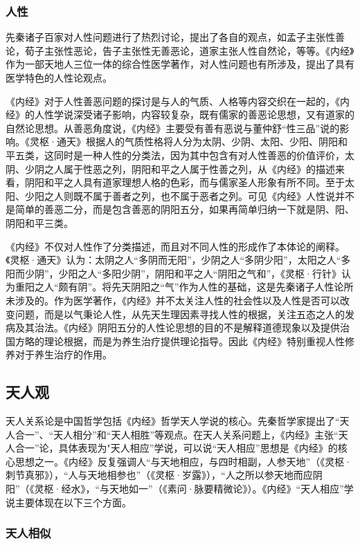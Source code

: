 \documentclass[draft,12pt]{ctexbook}
\begin{document}
\subsubsection{人性}%

先秦诸子百家对人性问题进行了热烈讨论，提出了各自的观点，如孟子主张性善论，荀子主张性恶论，告子主张性无善恶论，道家主张人性自然论，等等。《内经》作为一部天地人三位一体的综合性医学著作，对人性问题也有所涉及，提出了具有医学特色的人性论观点。

《内经》对于人性善恶问题的探讨是与人的气质、人格等内容交织在一起的，《内经》的人性学说深受诸子影响，内容较复杂，既有儒家的善恶论思想，又有道家的自然论思想。从善恶角度说，《内经》主要受有善有恶说与董仲舒“性三品”说的影响。《灵枢·通天》根据人的气质性格将人分为太阴、少阴、太阳、少阳、阴阳和平五类，这同时是一种人性的分类法，因为其中包含有对人性善恶的价值评价，太阴、少阴之人属于性恶之列，阴阳和平之人属于性善之列，从《内经》的描述来看，阴阳和平之人具有道家理想人格的色彩，而与儒家圣人形象有所不同。至于太阳、少阳之人则既不属于善者之列，也不属于恶者之列。可见《内经》人性说并不是简单的善恶二分，而是包含善恶的阴阳五分，如果再简单归纳一下就是阴、阳、阴阳和平三类。

《内经》不仅对人性作了分类描述，而且对不同人性的形成作了本体论的阐释。《灵枢·通天》认为：太阴之人“多阴而无阳”，少阴之人“多阴少阳”，太阳之人“多阳而少阴”，少阳之人“多阳少阴”，阴阳和平之人“阴阳之气和”，《灵枢·行针》认为重阳之人“颇有阴”。将先天阴阳之“气”作为人性的基础，这是先秦诸子人性论所未涉及的。作为医学著作，《内经》并不太关注人性的社会性以及人性是否可以改变问题，而是以气秉论人性，从先天生理因素寻找人性的根据，关注五态之人的发病及其治法。《内经》阴阳五分的人性论思想的目的不是解释道德现象以及提供治国方略的理论根据，而是为养生治疗提供理论指导。因此《内经》特别重视人性修养对于养生治疗的作用。

\subsection{天人观}%

天人关系论是中国哲学包括《内经》哲学天人学说的核心。先秦哲学家提出了“天人合一”、“天人相分”和“天人相胜”等观点。在天人关系问题上，《内经》主张“天人合一”论，具体表现为"天人相应”学说，可以说“天人相应”思想是《内经》的核心思想之一。《内经》反复强调人“与天地相应，与四时相副，人参天地”（《灵枢·刺节真邪》），“人与天地相参也”（《灵枢·岁露》），“人之所以参天地而应阴阳”（《灵枢·经水》，“与天地如一”（《素问·脉要精微论》）。《内经》“天人相应”学说主要体现在以下三个方面。

\subsubsection{天人相似}%
\end{document}
